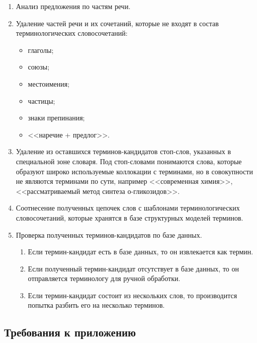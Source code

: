 \begin{enumerate}[label*=\arabic*.]
	\item Анализ предложения по частям речи.
	\item Удаление частей речи и их сочетаний, которые не входят в состав терминологических словосочетаний:
	
	\begin{itemize}[label*=---]
		\item глаголы;
		\item союзы;
		\item местоимения;
		\item частицы;
		\item знаки препинания;
		\item <<наречие + предлог>>.
		
	\end{itemize}
	
	\item Удаление из оставшихся терминов-кандидатов стоп-слов, указанных в специальной зоне словаря. Под стоп-словами понимаются слова, которые образуют широко используемые коллокации с терминами, но в совокупности не являются терминами по сути, например <<современная химия>>, <<рассматриваемый метод синтеза о-гликозидов>>.
	\item Соотнесение полученных цепочек слов с шаблонами терминологических словосочетаний, которые хранятся в базе структурных моделей терминов.
	\item Проверка полученных терминов-кандидатов по базе данных.
	
	\begin{enumerate}[label*=\arabic*.]
		
	\item Если термин-кандидат есть в базе данных, то он извлекается как термин.
	\item Если полученный термин-кандидат отсутствует в базе данных, то он отправляется терминологу для ручной обработки.
	\item Если термин-кандидат состоит из нескольких слов, то производится попытка разбить его на несколько терминов.
	
	\end{enumerate}
	
\end{enumerate}



\subsection{Требования к приложению}

